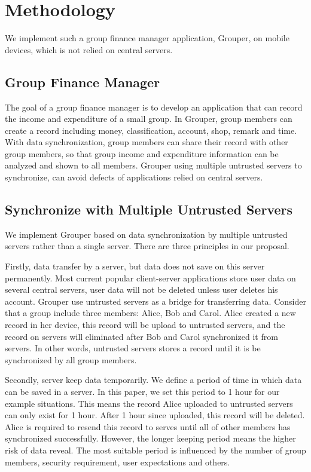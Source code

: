 \documentclass[twocolumn,10pt]{article}
\begin{document}
\section{Methodology}

We implement such a group finance manager application, Grouper, on mobile devices, which is not relied on central servers. 

\subsection{Group Finance Manager}
The goal of a group finance manager is to develop an application that can record the income and expenditure of a small group. In Grouper, group members can create a record including money, classification, account, shop, remark and time. With data synchronization, group members can share their record with other group members, so that group income and expenditure information can be analyzed and shown to all members. Grouper using multiple untrusted servers to synchronize, can avoid defects of applications relied on central servers. 

\subsection{Synchronize with Multiple Untrusted Servers}

We implement Grouper based on data synchronization by multiple untrusted servers rather than a single server. There are three principles in our proposal. 

Firstly, data transfer by a server, but data does not save on this server permanently. Most current popular client-server applications store user data on several central servers, user data will not be deleted unless user deletes his account. Grouper use untrusted servers as a bridge for transferring data. Consider that a group include three members: Alice, Bob and Carol. Alice created a new record in her device, this record will be upload to untrusted servers, and the record on servers will eliminated after Bob and Carol synchronized it from servers. In other words, untrusted servers stores a record until it is be synchronized by all group members.

Secondly, server keep data temporarily. We define a period of time in which data can be saved in a server. In this paper, we set this period to 1 hour for our example situations. This means the record Alice uploaded to untrusted servers can only exist for 1 hour. After 1 hour since uploaded, this record will be deleted. Alice is required to resend this record to serves until all of other members has synchronized successfully. However, the longer keeping period means the higher risk of data reveal. The most suitable period is influenced by the number of group members, security requirement, user expectations and others. 
\end{document}

